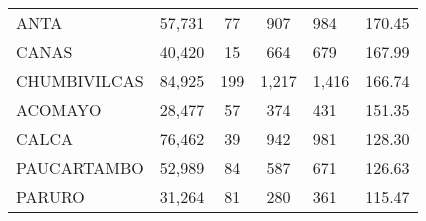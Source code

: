 \begin{tabular}{lrcclr}
	\cellcolor[HTML]{FFFF99}ANTA                                   & 57,731                                                         & 77                                                         & 907                  & 984                                                                 & 170.45                                                                       \\
	\cellcolor[HTML]{FFFF99}CANAS                                  & 40,420                                                         & 15                                                         & 664                  & 679                                                                 & 167.99                                                                       \\
	\cellcolor[HTML]{C6E0B4}CHUMBIVILCAS                           & 84,925                                                         & 199                                                        & 1,217                & 1,416                                                               & 166.74                                                                       \\
	\cellcolor[HTML]{C6E0B4}ACOMAYO                                & 28,477                                                         & 57                                                         & 374                  & 431                                                                 & 151.35                                                                       \\
	\cellcolor[HTML]{C6E0B4}CALCA                                  & 76,462                                                         & 39                                                         & 942                  & 981                                                                 & 128.30                                                                       \\
	\cellcolor[HTML]{C6E0B4}PAUCARTAMBO                            & 52,989                                                         & 84                                                         & 587                  & 671                                                                 & 126.63                                                                       \\
	\cellcolor[HTML]{C6E0B4}PARURO                                 & 31,264                                                         & 81                                                         & 280                  & 361                                                                 & 115.47                                                                       \\

\end{tabular}
